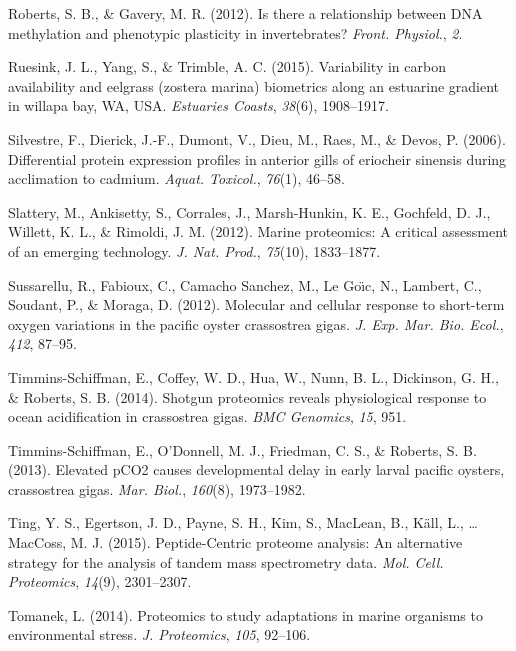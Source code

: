 \documentclass [11pt, proquest] {uwthesis}[2015/03/03]
\newlength{\cslhangindent}
\newenvironment{CSLReferences}%
{\setlength{\parindent}{0pt}%
\everypar{\setlength{\hangindent}{\cslhangindent}}\ignorespaces}%
{\par}
\begin{document}
\begin{CSLReferences}{1}{0}
\leavevmode\hypertarget{ref-Roberts2012}{}%
Roberts, S. B., \& Gavery, M. R. (2012). Is there a relationship between {DNA} methylation and phenotypic plasticity in invertebrates? \emph{Front. Physiol.}, \emph{2}.

\leavevmode\hypertarget{ref-Ruesink2015}{}%
Ruesink, J. L., Yang, S., \& Trimble, A. C. (2015). Variability in carbon availability and eelgrass (zostera marina) biometrics along an estuarine gradient in willapa bay, {WA}, {USA}. \emph{Estuaries Coasts}, \emph{38}(6), 1908--1917.

\leavevmode\hypertarget{ref-Silvestre2006}{}%
Silvestre, F., Dierick, J.-F., Dumont, V., Dieu, M., Raes, M., \& Devos, P. (2006). Differential protein expression profiles in anterior gills of eriocheir sinensis during acclimation to cadmium. \emph{Aquat. Toxicol.}, \emph{76}(1), 46--58.

\leavevmode\hypertarget{ref-Slattery2012}{}%
Slattery, M., Ankisetty, S., Corrales, J., Marsh-Hunkin, K. E., Gochfeld, D. J., Willett, K. L., \& Rimoldi, J. M. (2012). Marine proteomics: A critical assessment of an emerging technology. \emph{J. Nat. Prod.}, \emph{75}(10), 1833--1877.

\leavevmode\hypertarget{ref-Sussarellu2012}{}%
Sussarellu, R., Fabioux, C., Camacho Sanchez, M., Le Goı̈c, N., Lambert, C., Soudant, P., \& Moraga, D. (2012). Molecular and cellular response to short-term oxygen variations in the pacific oyster crassostrea gigas. \emph{J. Exp. Mar. Bio. Ecol.}, \emph{412}, 87--95.

\leavevmode\hypertarget{ref-Timmins-Schiffman2014}{}%
Timmins-Schiffman, E., Coffey, W. D., Hua, W., Nunn, B. L., Dickinson, G. H., \& Roberts, S. B. (2014). Shotgun proteomics reveals physiological response to ocean acidification in crassostrea gigas. \emph{BMC Genomics}, \emph{15}, 951.

\leavevmode\hypertarget{ref-Timmins-Schiffman2013}{}%
Timmins-Schiffman, E., O'Donnell, M. J., Friedman, C. S., \& Roberts, S. B. (2013). Elevated {pCO2} causes developmental delay in early larval pacific oysters, crassostrea gigas. \emph{Mar. Biol.}, \emph{160}(8), 1973--1982.

\leavevmode\hypertarget{ref-Ting2015}{}%
Ting, Y. S., Egertson, J. D., Payne, S. H., Kim, S., MacLean, B., Käll, L., \ldots{} MacCoss, M. J. (2015). {Peptide-Centric} proteome analysis: An alternative strategy for the analysis of tandem mass spectrometry data. \emph{Mol. Cell. Proteomics}, \emph{14}(9), 2301--2307.

\leavevmode\hypertarget{ref-Tomanek2014}{}%
Tomanek, L. (2014). Proteomics to study adaptations in marine organisms to environmental stress. \emph{J. Proteomics}, \emph{105}, 92--106.


\end{CSLReferences}
\end{document}
